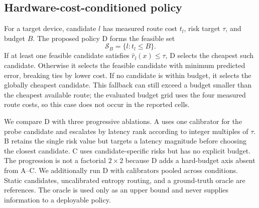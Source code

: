 \documentclass[a4paper,review,12pt]{elsarticle}
\begin{document}
\subsection{Hardware-cost-conditioned policy}
\label{sec:policy}

For a target device, candidate $l$ has measured route cost $t_l$, risk target $\tau$, and budget $B$. The proposed policy D forms the feasible set
\begin{equation}
\mathcal{S}_B=\{l:t_l\leq B\}.
\label{eq:feasible}
\end{equation}
If at least one feasible candidate satisfies $\widehat{r}_l(x)\leq\tau$, D selects the cheapest such candidate. Otherwise it selects the feasible candidate with minimum predicted error, breaking ties by lower cost. If no candidate is within budget, it selects the globally cheapest candidate. This fallback can still exceed a budget smaller than the cheapest available route; the evaluated budget grid uses the four measured route costs, so this case does not occur in the reported cells.

We compare D with three progressive ablations. A uses one calibrator for the probe candidate and escalates by latency rank according to integer multiples of $\tau$. B retains the single risk value but targets a latency magnitude before choosing the closest candidate. C uses candidate-specific risks but has no explicit budget. The progression is not a factorial $2\times2$ because D adds a hard-budget axis absent from A--C. We additionally run D with calibrators pooled across conditions. Static candidates, uncalibrated entropy routing, and a ground-truth oracle are references. The oracle is used only as an upper bound and never supplies information to a deployable policy.

\begin{table}[H]
\centering
\caption{Routing-policy roles and information access. ``Per condition'' means that the deployment domain is configured before inference; pooled D removes that requirement. The oracle uses held-out ground truth and is not deployable.}
\label{tab:policy-summary}
\small
{}
\end{table}
\end{document}
